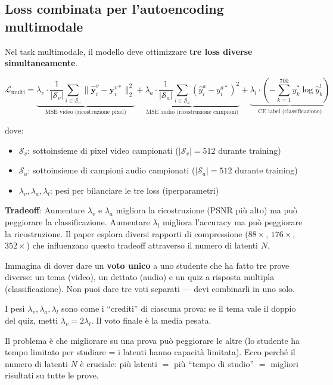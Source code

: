 \documentclass[12pt,a4paper]{article}
\begin{document}
\subsection{Loss combinata per l'autoencoding multimodale}

Nel task multimodale, il modello deve ottimizzare \textbf{tre loss diverse simultaneamente}.

\begin{formulabox}
\[
\mathcal{L}_{\text{multi}} = \underbrace{\lambda_v \cdot \frac{1}{|\mathcal{S}_v|}\sum_{i \in \mathcal{S}_v} \|\hat{\mathbf{y}}_i^v - \mathbf{y}_i^{v*}\|_2^2}_{\text{MSE video (ricostruzione pixel)}} + \underbrace{\lambda_a \cdot \frac{1}{|\mathcal{S}_a|}\sum_{i \in \mathcal{S}_a} (\hat{y}_i^a - y_i^{a*})^2}_{\text{MSE audio (ricostruzione campioni)}} + \underbrace{\lambda_l \cdot \left(-\sum_{k=1}^{700} y_k^* \log \hat{y}_k^l\right)}_{\text{CE label (classificazione)}}
\]

dove:
\begin{itemize}
    \item $\mathcal{S}_v$: sottoinsieme di pixel video campionati ($|\mathcal{S}_v| = 512$ durante training)
    \item $\mathcal{S}_a$: sottoinsieme di campioni audio campionati ($|\mathcal{S}_a| = 512$ durante training)
    \item $\lambda_v, \lambda_a, \lambda_l$: pesi per bilanciare le tre loss (iperparametri)
\end{itemize}

\textbf{Tradeoff}: Aumentare $\lambda_v$ e $\lambda_a$ migliora la ricostruzione (PSNR pi\`u alto) ma pu\`o peggiorare la classificazione. Aumentare $\lambda_l$ migliora l'accuracy ma pu\`o peggiorare la ricostruzione. Il paper esplora diversi rapporti di compressione ($88\times$, $176\times$, $352\times$) che influenzano questo tradeoff attraverso il numero di latenti $N$.
\end{formulabox}

\begin{notabox}
Immagina di dover dare un \textbf{voto unico} a uno studente che ha fatto tre prove diverse: un tema (video), un dettato (audio) e un quiz a risposta multipla (classificazione). Non puoi dare tre voti separati --- devi combinarli in uno solo.

I pesi $\lambda_v, \lambda_a, \lambda_l$ sono come i ``crediti'' di ciascuna prova: se il tema vale il doppio del quiz, metti $\lambda_v = 2\lambda_l$. Il voto finale \`e la media pesata.

Il problema \`e che migliorare su una prova pu\`o peggiorare le altre (lo studente ha tempo limitato per studiare = i latenti hanno capacit\`a limitata). Ecco perch\'e il numero di latenti $N$ \`e cruciale: pi\`u latenti $=$ pi\`u ``tempo di studio'' $=$ migliori risultati su tutte le prove.
\end{notabox}
\end{document}
